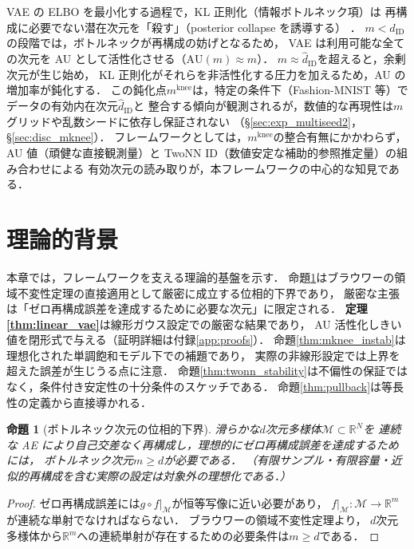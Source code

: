 \documentclass[11pt,a4paper]{jsarticle}
\newtheorem{proposition}{命題}
\newcommand{\R}{\mathbb{R}}
\newcommand{\mknee}{m^{\mathrm{knee}}}
\begin{document}
VAE の ELBO を最小化する過程で，KL 正則化（情報ボトルネック項）は
再構成に必要でない潜在次元を「殺す」（posterior collapse を誘導する）
\cite{lucas2019elbo,higgins2017betavae}．
$m < \hat{d}_\mathrm{ID}$の段階では，ボトルネックが再構成の妨げとなるため，
VAE は利用可能な全ての次元を AU として活性化させる（$\mathrm{AU}(m) \approx m$）．
$m \approx \hat{d}_\mathrm{ID}$を超えると，余剰次元が生じ始め，
KL 正則化がそれらを非活性化する圧力を加えるため，AU の増加率が鈍化する．
この鈍化点$\mknee$は，特定の条件下（Fashion-MNIST 等）でデータの有効内在次元$\hat{d}_\mathrm{ID}$と
整合する傾向が観測されるが，数値的な再現性は$m$グリッドや乱数シードに依存し保証されない
（§\ref{sec:exp_multiseed2}，§\ref{sec:disc_mknee}）．
フレームワークとしては，$\mknee$の整合有無にかかわらず，
AU 値（頑健な直接観測量）と TwoNN ID（数値安定な補助的参照推定量）の組み合わせによる
有効次元の読み取りが，本フレームワークの中心的な知見である．

\section{理論的背景}\label{sec:theory}

本章では，フレームワークを支える理論的基盤を示す．
命題\ref{thm:lower_bound}はブラウワーの領域不変性定理の直接適用として厳密に成立する位相的下界であり，
厳密な主張は「ゼロ再構成誤差を達成するために必要な次元」に限定される．
\textbf{定理\ref{thm:linear_vae}}は線形ガウス設定での厳密な結果であり，
AU 活性化しきい値を閉形式で与える（証明詳細は付録\ref{app:proofs}）．
命題\ref{thm:mknee_instab}は理想化された単調飽和モデル下での補題であり，
実際の非線形設定では上界を超えた誤差が生じうる点に注意．
命題\ref{thm:twonn_stability}は不偏性の保証ではなく，条件付き安定性の十分条件のスケッチである．
命題\ref{thm:pullback}は等長性の定義から直接導かれる．

\begin{proposition}[ボトルネック次元の位相的下界]\label{thm:lower_bound}
滑らかな$d$次元多様体$\mathcal{M} \subset \R^N$を
連続な AE により自己交差なく再構成し，理想的にゼロ再構成誤差を達成するためには，
ボトルネック次元$m \geq d$が必要である．
（有限サンプル・有限容量・近似的再構成を含む実際の設定は対象外の理想化である．）
\end{proposition}

\begin{proof}
ゼロ再構成誤差には$g \circ f|_\mathcal{M}$が恒等写像に近い必要があり，
$f|_\mathcal{M}: \mathcal{M} \to \R^m$が連続な単射でなければならない．
ブラウワーの領域不変性定理\cite{hatcher2002algebraic}より，
$d$次元多様体から$\R^m$への連続単射が存在するための必要条件は$m \geq d$である．
\end{proof}
\end{document}
